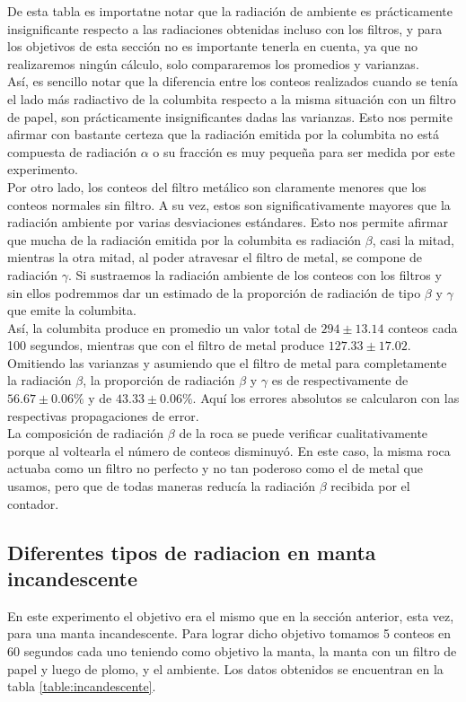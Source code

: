 \documentclass[%
 reprint,
 amsmath,amssymb,
 aps,
]{revtex4-1}
\begin{document}
De esta tabla es importatne notar que la radiación de ambiente es prácticamente insignificante respecto a las radiaciones obtenidas incluso con los filtros, y para los objetivos de esta sección no es importante tenerla en cuenta, ya que no realizaremos ningún cálculo, solo compararemos los promedios y varianzas.\\

Así, es sencillo notar que la diferencia entre los conteos realizados cuando se tenía el lado más radiactivo de la columbita respecto a la misma situación con un filtro de papel, son prácticamente insignificantes dadas las varianzas. Esto nos permite afirmar con bastante certeza que la radiación emitida por la columbita no está compuesta de radiación $\alpha$ o su fracción es muy pequeña para ser medida por este experimento. \\

Por otro lado, los conteos del filtro metálico son claramente menores que los conteos normales sin filtro. A su vez, estos son significativamente mayores que la radiación ambiente por varias desviaciones estándares. Esto nos permite afirmar que mucha de la radiación emitida por la columbita es radiación $\beta$, casi la mitad, mientras la otra mitad, al poder atravesar el filtro de metal, se compone de radiación $\gamma$. Si sustraemos la radiación ambiente de los conteos con los filtros y sin ellos podremmos dar un estimado de la proporción de radiación de tipo $\beta$ y $\gamma$ que emite la columbita.\\

Así, la columbita produce en promedio un valor total de $294 \pm 13.14$ conteos cada 100 segundos, mientras que con el filtro de metal produce $127.33 \pm 17.02$. Omitiendo las varianzas y asumiendo que el filtro de metal para completamente la radiación $\beta$, la proporción de radiación $\beta$ y $\gamma$ es de respectivamente de $56.67 \pm 0.06\%$  y de $43.33 \pm 0.06\%$. Aquí los errores absolutos se calcularon con las respectivas propagaciones de error.\\

La composición de radiación $\beta$ de la roca se puede verificar cualitativamente porque al voltearla el número de conteos disminuyó. En este caso, la misma roca actuaba como un filtro no perfecto y no tan poderoso como el de metal que usamos, pero que de todas maneras reducía la radiación $\beta$ recibida por el contador.\\

\subsection{\label{sec:level2}Diferentes tipos de radiacion en manta incandescente}
En este experimento el objetivo era el mismo que en la sección anterior, esta vez, para una manta incandescente. Para lograr dicho objetivo tomamos 5 conteos en 60 segundos cada uno teniendo como objetivo la manta, la manta con un filtro de papel y luego de plomo, y el ambiente. Los datos obtenidos se encuentran en la tabla \ref{table:incandescente}.\\
\end{document}
